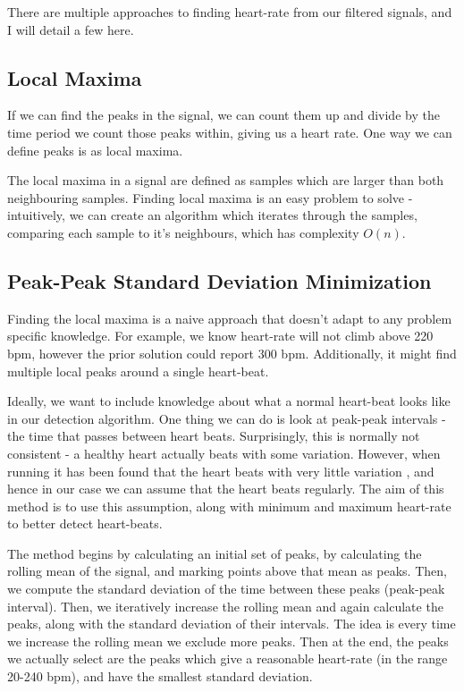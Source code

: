 \documentclass[12pt,a4paper,twoside,openright]{report}
\begin{document}
There are multiple approaches to finding heart-rate from our filtered
signals, and I will detail a few here.

\subsection{Local Maxima}

If we can find the peaks in the signal, we can count them up and divide by the
time period we count those peaks within, giving us a heart rate. One way we
can define peaks is as local maxima.

The local maxima in a signal are defined as samples which are larger than both
neighbouring samples. Finding local maxima is an easy problem to solve - 
intuitively, we can create an algorithm which iterates through the samples,
comparing each sample to it's neighbours, which has complexity \(O(n)\).

\subsection{Peak-Peak Standard Deviation Minimization}
\label{sec:sd-min}

Finding the local maxima is a naive approach that doesn't adapt to any problem
specific knowledge. For example, we know heart-rate will not climb above 220
bpm, however the prior solution could report 300 bpm. Additionally, it might
find multiple local peaks around a single heart-beat. 

Ideally, we want to include knowledge about what a normal heart-beat looks
like in our detection algorithm. One thing we can do is look at peak-peak
intervals - the time that passes between heart beats. Surprisingly, this is
normally not consistent - a healthy heart actually beats with some
variation. However, when running it has been found that the heart beats with
very little variation \cite{michael17}, and hence in our case we can assume that the heart
beats regularly. The aim of this method is to use this assumption, along with
minimum and maximum heart-rate to better detect heart-beats.

The method begins by calculating an initial set of peaks, by calculating the
rolling mean of the signal, and marking points above that mean as peaks. Then,
we compute the standard deviation of the time between these peaks (peak-peak
interval). Then, we iteratively increase the rolling mean and again calculate
the peaks, along with
the standard deviation of their intervals. The idea is every time we increase the rolling mean we 
exclude more peaks. Then at the end, the peaks we actually select are the peaks which give a reasonable
heart-rate (in the range 20-240 bpm), and have the smallest standard deviation.
\end{document}
